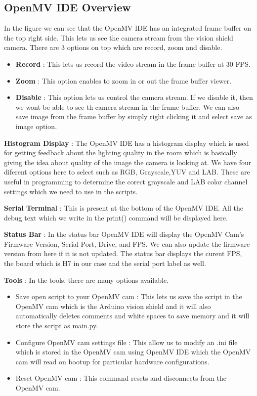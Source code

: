 \subsection{OpenMV IDE Overview}
In the figure  we can see that the OpenMV IDE has an integrated frame buffer on the top right side. This lets us see the camera stream from the vision shield camera. There are 3 options on top which are record, zoom and disable.
\begin{itemize}
	\item  \textbf{Record} : This lets us record the video stream in the frame buffer at 30 FPS.
	\item \textbf{Zoom} : This option enables to zoom in or out the frame buffer viewer.
	\item \textbf{Disable} : This option lets us control the camera stream. If we disable it, then we wont be able to see th camera stream in the frame buffer. We can also save image from the frame buffer by simply right clicking it and select save as image option.
	
\end{itemize}
\textbf{Histogram Display} :
The OpenMV IDE has a histogram display which is used for getting feedback about the lighting quality in the room which is basically giving the idea about quality of the image the camera is looking at. We have four diferent options here to select such as RGB, Grayscale,YUV and LAB. These are useful in programming to determine the corect grayscale and LAB color channel settings which we need to use in the scripts.

\textbf{Serial Terminal} :
This is present at the bottom of the OpenMV IDE. All the debug text which we write in the print() command will be displayed here.

\textbf{Status Bar} :
In the status bar OpenMV IDE will display the OpenMV Cam’s Firmware Version, Serial Port, Drive, and FPS. We can also update the firmware version from here if it is not updated. The status bar displays the curent FPS, the board which is H7 in our case and the serial port label as well.

\textbf{Tools} :
In the tools, there are many options available.
\begin{itemize}
\vspace{-0.6mm}
	\item Save open script to your OpenMV cam : This lets us save the script in the OpenMV cam which is the Arduino vision shield and it will also automatically deletes comments and white spaces to save memory and it will store the script as main.py.
	\vspace{-0.6mm}
	\item Configure OpenMV cam settings file : This allow us to modify an .ini file which is stored in the OpenMV cam using OpenMV IDE which the OpenMV cam will read on bootup for particular hardware configurations.
	\vspace{-0.6mm}
	\item Reset OpenMV cam : This command resets and disconnects from the OpenMV cam.
	\vspace{-0.6mm}
\end{itemize} 






